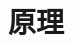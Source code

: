 \documentclass[uplatex,a4j,11pt,dvipdfmx]{jsarticle}
\newcommand{\gnu}[2]{
\begin{figure}[hptb]
\begin{center}

\caption{#1}
\label{fig:#2}
\end{center}
\end{figure}
}
\begin{document}
\section{原理}









\end{document}
